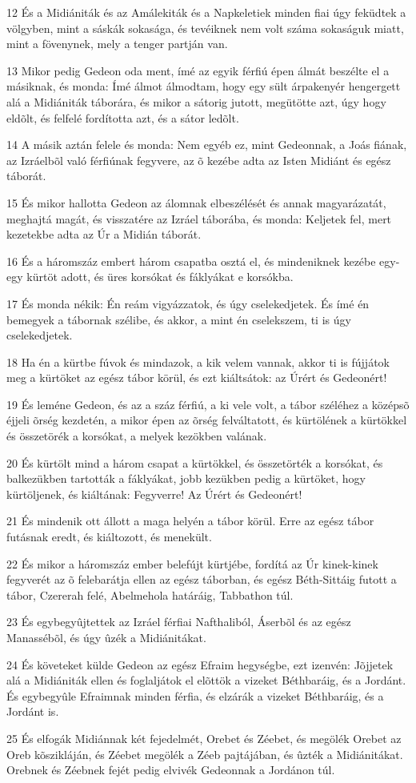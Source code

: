 \par 12 És a Midiániták és az Amálekiták és a Napkeletiek minden fiai úgy feküdtek a völgyben, mint a sáskák sokasága, és tevéiknek nem volt száma sokaságuk miatt, mint a fövenynek, mely a tenger partján van.
\par 13 Mikor pedig Gedeon oda ment, ímé az egyik férfiú épen álmát beszélte el a másiknak, és monda: Ímé álmot álmodtam, hogy egy sült árpakenyér hengergett alá a Midiániták táborára, és mikor a sátorig jutott, megütötte azt, úgy hogy eldõlt, és felfelé fordította azt, és a sátor ledõlt.
\par 14 A másik aztán felele és monda: Nem egyéb ez, mint Gedeonnak, a Joás fiának, az Izráelbõl való férfiúnak fegyvere, az õ kezébe adta az Isten Midiánt és egész táborát.
\par 15 És mikor hallotta Gedeon az álomnak elbeszélését és annak magyarázatát, meghajtá magát, és visszatére az Izráel táborába, és monda: Keljetek fel, mert kezetekbe adta az Úr a Midián táborát.
\par 16 És a háromszáz embert három csapatba osztá el, és mindeniknek kezébe egy-egy kürtöt adott, és üres korsókat és fáklyákat e korsókba.
\par 17 És monda nékik: Én reám vigyázzatok, és úgy cselekedjetek. És ímé én bemegyek a tábornak szélibe, és akkor, a mint én cselekszem, ti is úgy cselekedjetek.
\par 18 Ha én a kürtbe fúvok és mindazok, a kik velem vannak, akkor ti is fújjátok meg a kürtöket az egész tábor körül, és ezt kiáltsátok: az Úrért és Gedeonért!
\par 19 És leméne Gedeon, és az a száz férfiú, a ki vele volt, a tábor széléhez a középsõ éjjeli õrség kezdetén, a mikor épen az õrség felváltatott, és kürtölének a kürtökkel és összetörék a korsókat, a melyek kezökben valának.
\par 20 És kürtölt mind a három csapat a kürtökkel, és összetörték a korsókat, és balkezükben tartották a fáklyákat, jobb kezükben pedig a kürtöket, hogy kürtöljenek, és kiáltának: Fegyverre! Az Úrért és Gedeonért!
\par 21 És mindenik ott állott a maga helyén a tábor körül. Erre az egész tábor futásnak eredt, és kiáltozott, és menekült.
\par 22 És mikor a háromszáz ember belefújt kürtjébe, fordítá az Úr kinek-kinek fegyverét az õ felebarátja ellen az egész táborban, és egész Béth-Sittáig futott a tábor, Czererah felé, Abelmehola határáig, Tabbathon túl.
\par 23 És egybegyûjtettek az Izráel férfiai Nafthaliból, Áserbõl és az egész Manassébõl, és úgy ûzék a Midiánitákat.
\par 24 És követeket külde Gedeon az egész Efraim hegységbe, ezt izenvén: Jõjjetek alá a Midiániták ellen és foglaljátok el elõttök a vizeket Béthbaráig, és a Jordánt. És egybegyûle Efraimnak minden férfia, és elzárák a vizeket Béthbaráig, és a Jordánt is.
\par 25 És elfogák Midiánnak két fejedelmét, Orebet és Zéebet, és megölék Orebet az Oreb kõszikláján, és Zéebet megölék a Zéeb pajtájában, és ûzték a Midiánitákat. Orebnek és Zéebnek fejét pedig elvivék Gedeonnak a Jordánon túl.


